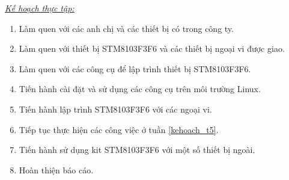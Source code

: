 \underline{\textit{Kế hoạch thực tập:}}
\begin{enumerate}[label={-- Tuần \theenumi:}, leftmargin=2.5cm, ref={\theenumi}]
\item Làm quen với các anh chị và  các thiết bị có trong công ty.
\item Làm quen với thiết bị STM8103F3F6 và các thiết bị ngoại vi được giao.
\item Làm quen với các công cụ để lập trình thiết bị STM8103F3F6.
\item Tiến hành cài đặt và sử dụng các công cụ trên môi trường Linux.
\item Tiến hành lập trình STM8103F3F6 với các ngoại vi.\label{kehoach_t5}
\item Tiếp tục thực hiện các công việc ở tuần \ref{kehoach_t5}.
\item Tiến hành sử dụng kit STM8103F3F6 với một số thiết bị ngoài.
\item Hoàn thiện báo cáo.
\end{enumerate}
